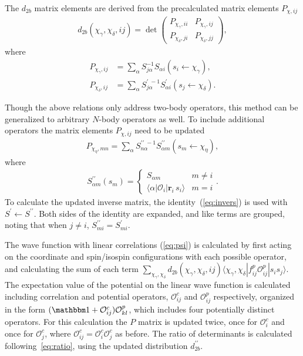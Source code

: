 \documentclass[aps,prc,twocolumn,superscriptaddress,floatfix]{revtex4-1}
\begin{document}
The $d_{2b}$ matrix elements are derived from the precalculated matrix elements $P_{\chi,ij}$
\begin{align}
   d_{2b}(\chi_\gamma,\chi_\delta,ij)=\det\begin{pmatrix}P_{\chi_\gamma,ii} & P_{\chi_\gamma,ij} \\ P_{\chi_\delta,ji} & P_{\chi_\delta,jj}\end{pmatrix} ,
\end{align}
where
\begin{align}
   P_{\chi_\gamma,ij} &=\sum_\alpha S^{-1}_{j\alpha}S_{\alpha i}(s_i\leftarrow \chi_\gamma) , \nonumber \\
   P_{\chi_\delta,ij} &=\sum_\alpha S^{\prime\;-1}_{j\alpha}S^\prime_{\alpha i}(s_j\leftarrow \chi_\delta) .
\end{align}

Though the above relations only address two-body operators, 
this method can be generalized to arbitrary $N$-body operators as well. 
To include additional operators the matrix elements $P_{\chi,ij}$ need to be updated
\begin{align}
   P_{\chi_\eta,mn}=\sum_\alpha S^{\prime\prime\;-1}_{n\alpha}S^{\prime\prime}_{\alpha m}(s_m\leftarrow \chi_\eta) ,
\end{align}
where
\begin{align}
   S^{\prime\prime}_{\alpha m}(s_m) = \left\{
   \begin{array}{cc}
      S_{\alpha m} & m \ne i\\
      \langle\alpha|\mathcal O_i|\mathbf{r}_i\,s_i\rangle  & m = i
   \end{array} .
   \right.
\end{align}
To calculate the updated inverse matrix, the identity~(\ref{eq:invers}) 
is used with $S^\prime\leftarrow S^{\prime\prime}$. 
Both sides of the identity are expanded, and like terms are grouped, 
noting that when $j \ne i$, $S^{\prime\prime}_{mi}=S^\prime_{mi}$.

The wave function with linear correlations (\cref{eq:psi}) is calculated 
by first acting on the coordinate and spin/isospin configurations with 
each possible operator, and calculating the sum of each term 
$\sum_{\chi_\gamma,\chi_\delta}d_{2b}(\chi_\gamma,\chi_\delta,ij)\langle\chi_\gamma,\chi_\delta|f_{ij}^p\mathcal{O}_{ij}^p|s_i s_j\rangle$. 
The expectation value of the potential on the linear wave function 
is calculated including correlation and potential operators, 
$\mathcal{O}^c_{ij}$ and $\mathcal{O}^p_{ij}$ respectively, 
organized in the form $(\mathbbm1+\mathcal{O}^c_{ij})\mathcal{O}^p_{kl}$,
which includes four potentially distinct operators. 
For this calculation the $P$ matrix is updated twice, 
once for $\mathcal{O}^c_i$ and once for $\mathcal{O}^c_j$, 
where $\mathcal{O}^c_{ij}=\mathcal{O}^c_i\mathcal{O}^c_j$ as before.  
The ratio of determinants is calculated following~\cref{eq:ratio},
using the updated distribution $d^{\prime\prime}_{2b}$.
\end{document}

